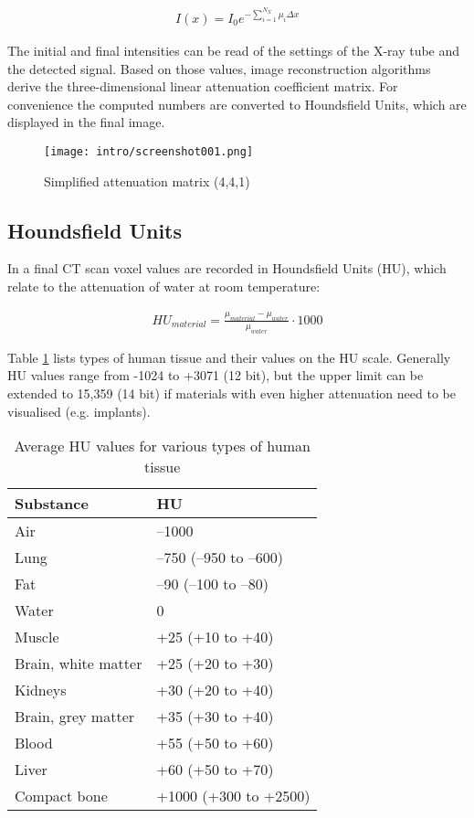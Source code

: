 \begin{align}
\label{eq:mu_sum}
I(x) = I_0 e^{- \sum\limits_{i=1}^{N_X} \mu_i \Delta x}
\end{align}

The initial and final intensities can be read of the settings of the X-ray tube and the detected signal.
Based on those values, image reconstruction algorithms derive the three-dimensional linear attenuation coefficient matrix.
For convenience the computed numbers are converted to Houndsfield Units, which are displayed in the final image.

\begin{figure}[!htb]
	\centering
	\texttt{[image: intro/screenshot001.png]}
	\caption{Simplified attenuation matrix (4,4,1)}
	\label{fig:voxel_matrix}
\end{figure}

\subsection{Houndsfield Units}

In a final CT scan voxel values are recorded in Houndsfield Units (HU), which relate to the attenuation of water at room temperature:

\begin{align}
HU_{material} = \frac{\mu_{material} - \mu_{water}}{\mu_{water}} \cdot 1000
\end{align}

Table \ref{tab:HU} lists types of human tissue and their values on the HU scale.
Generally HU values range from -1024 to +3071 (12 bit), but the upper limit can be extended to 15,359 (14 bit) if materials with even higher attenuation need to be visualised (e.g. implants).

\begin{table}[]
	\centering
	\caption{Average HU values for various types of human tissue}
	\label{tab:HU}
	\begin{tabular}{@{}ll@{}}
		\toprule
		Substance           & HU                     \\ \midrule
		Air                 & –1000                  \\
		Lung                & –750 (–950 to –600)    \\
		Fat                 & –90 (–100 to –80)      \\
		Water               & 0                      \\
		Muscle              & +25 (+10 to +40)       \\
		Brain, white matter & +25 (+20 to +30)       \\
		Kidneys             & +30 (+20 to +40)       \\
		Brain, grey matter  & +35 (+30 to +40)       \\
		Blood               & +55 (+50 to +60)       \\
		Liver               & +60 (+50 to +70)       \\
		Compact bone        & +1000 (+300 to +2500)  \\ \bottomrule
	\end{tabular}
\end{table}

